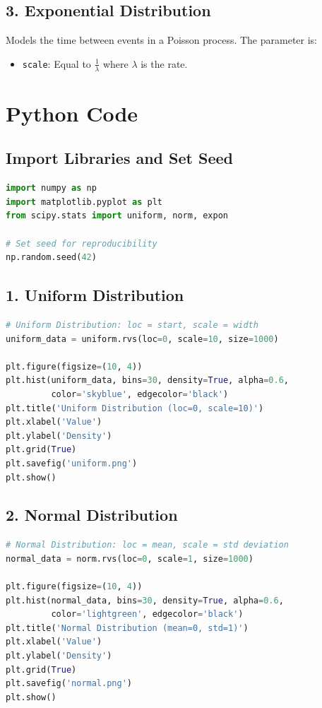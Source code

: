 \documentclass[12pt]{article}
\begin{document}
\subsection*{3. Exponential Distribution}
Models the time between events in a Poisson process. The parameter is:
\begin{itemize}
    \item \texttt{scale}: Equal to \( \frac{1}{\lambda} \) where \( \lambda \) is the rate.
\end{itemize}

\section*{Python Code}

\subsection*{Import Libraries and Set Seed}
\begin{lstlisting}[language=Python]
import numpy as np
import matplotlib.pyplot as plt
from scipy.stats import uniform, norm, expon

# Set seed for reproducibility
np.random.seed(42)
\end{lstlisting}

\subsection*{1. Uniform Distribution}
\begin{lstlisting}[language=Python]
# Uniform Distribution: loc = start, scale = width
uniform_data = uniform.rvs(loc=0, scale=10, size=1000)

plt.figure(figsize=(10, 4))
plt.hist(uniform_data, bins=30, density=True, alpha=0.6, 
         color='skyblue', edgecolor='black')
plt.title('Uniform Distribution (loc=0, scale=10)')
plt.xlabel('Value')
plt.ylabel('Density')
plt.grid(True)
plt.savefig('uniform.png')
plt.show()
\end{lstlisting}

\subsection*{2. Normal Distribution}
\begin{lstlisting}[language=Python]
# Normal Distribution: loc = mean, scale = std deviation
normal_data = norm.rvs(loc=0, scale=1, size=1000)

plt.figure(figsize=(10, 4))
plt.hist(normal_data, bins=30, density=True, alpha=0.6, 
         color='lightgreen', edgecolor='black')
plt.title('Normal Distribution (mean=0, std=1)')
plt.xlabel('Value')
plt.ylabel('Density')
plt.grid(True)
plt.savefig('normal.png')
plt.show()
\end{lstlisting}
\end{document}
